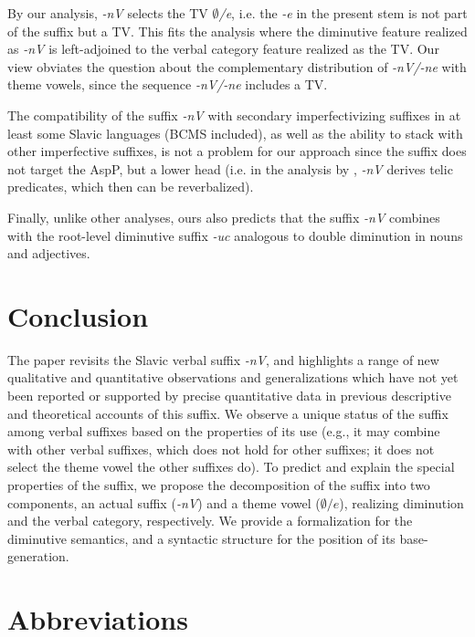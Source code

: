 \documentclass[output=paper,colorlinks,citecolor=brown]{langscibook}
\begin{document}
By our analysis, \textit{-nV} selects the TV \textit{$∅$/e}, i.e. the \textit{-e} in the present stem is not part of the suffix but a TV. This fits the analysis where the diminutive feature realized as \textit{-nV} is left-adjoined to the verbal category feature realized as the TV. Our view obviates the question about the complementary distribution of \textit{-nV/-ne} with theme vowels, since the sequence \textit{-nV/-ne} includes a TV.

The compatibility of the suffix \textit{-nV} with secondary imperfectivizing suffixes in at least some Slavic languages (BCMS included), as well as the ability to stack with other imperfective suffixes, is not a problem for our approach since the suffix does not target the AspP, but a lower head (i.e. in the analysis by \citealt{ArsenijevicEtAl2023}, \textit{-nV} derives telic predicates, which then can be reverbalized).

Finally, unlike other analyses, ours also predicts that the suffix \textit{-nV} combines with the root-level diminutive suffix \textit{-uc} analogous to double diminution in nouns and adjectives.

\section{Conclusion} \label{str:sect:Conclusion}

The paper revisits the Slavic verbal suffix \textit{-nV}, and highlights a range of new qualitative and quantitative observations and generalizations which have not yet been reported or supported by precise quantitative data in previous descriptive and theoretical accounts of this suffix. We observe a unique status of the suffix among verbal suffixes based on the properties of its use (e.g., it may combine with other verbal suffixes, which does not hold for other suffixes; it does not select the theme vowel the other suffixes do). To predict and explain the special properties of the suffix, we propose the decomposition of the suffix into two components, an actual suffix (\textit{-nV}) and a theme vowel (\textit{$∅/e$}), realizing diminution and the verbal category, respectively. We provide a formalization for the diminutive semantics, and a syntactic structure for the position of its base-generation.

\section*{Abbreviations}
\end{document}
